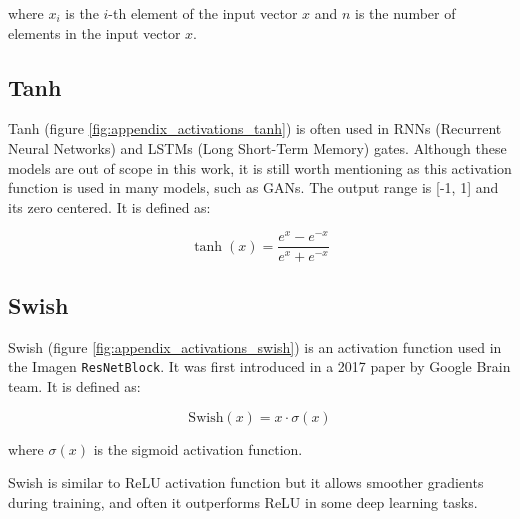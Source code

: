 where $x_i$ is the $i$-th element of the input vector $x$ and $n$ is the number of elements in the input vector $x$.






\subsection*{Tanh}

Tanh (figure \ref{fig:appendix_activations_tanh}) is often used in RNNs (Recurrent Neural Networks) and LSTMs (Long Short-Term Memory) gates. Although these models are out of scope in this work, it is still worth mentioning as this activation function is used in many models, such as GANs. The output range is [-1, 1] and its zero centered. It is defined as:

\begin{equation*}
    \tanh(x) = \frac{e^{x} - e^{-x}}{e^{x} + e^{-x}}
\end{equation*}








\subsection*{Swish}

Swish (figure \ref{fig:appendix_activations_swish}) is an activation function used in the Imagen \texttt{ResNetBlock}. It was first introduced in a 2017 paper \cite{ramachandran2017swish} by Google Brain team. It is defined as:

\begin{equation}
    \text{Swish}(x) = x \cdot \sigma(x)
    \label{eq:appendix_activations_swish}
\end{equation}

where $\sigma(x)$ is the sigmoid activation function.

Swish is similar to ReLU activation function but it allows smoother gradients during training, and often it outperforms ReLU in some deep learning tasks.

